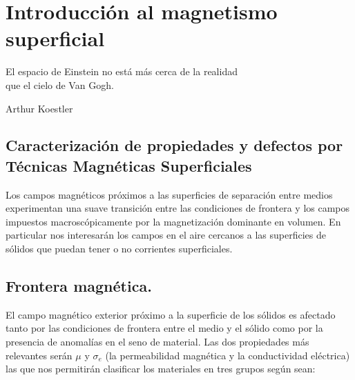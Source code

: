 
\chapter{Introducción al magnetismo superficial} %

\label{Chapter5} %




\vspace{10mm}

\begin{center}
El espacio de Einstein no está más cerca de la realidad \\ que el cielo de Van Gogh.

\hspace{8.0cm} Arthur Koestler\\
\end{center}

\vspace{10mm}


\section{Caracterización de propiedades y defectos por Técnicas Magnéticas Superficiales}

Los campos magnéticos próximos a las superficies de separación entre medios experimentan una suave transición entre las condiciones de frontera  y los campos impuestos macroscópicamente por la magnetización dominante en volumen. En particular nos interesarán los campos en el aire cercanos a las superficies de sólidos que puedan tener o no corrientes superficiales.


\section{Frontera magnética.}

El campo magnético exterior próximo a la superficie de los sólidos es afectado tanto por las condiciones de frontera entre el medio y el sólido como por la presencia de anomalías en el seno de material. Las dos propiedades más relevantes serán $\mu$ y $\sigma_{e}$ (la permeabilidad magnética y la conductividad eléctrica) las que nos permitirán clasificar los materiales en tres grupos según sean:

